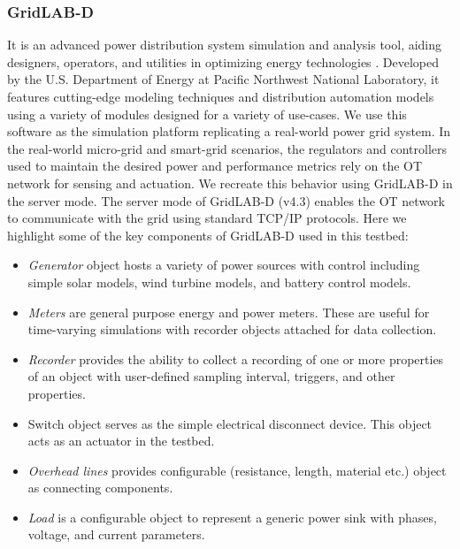 \subsubsection{GridLAB-D} It is an advanced power distribution system simulation and analysis tool, aiding designers, operators, and utilities in optimizing energy technologies \cite{chassin2014gridlab}. Developed by the U.S. Department of Energy at Pacific Northwest National Laboratory, it features cutting-edge modeling techniques and distribution automation models using a variety of modules designed for a variety of use-cases. We use this software as the simulation platform replicating a real-world power grid system. In the real-world micro-grid and smart-grid scenarios, the regulators and controllers used to maintain the desired power and performance metrics rely on the OT network for sensing and actuation. We recreate this behavior using GridLAB-D in the server mode. The server mode of GridLAB-D (v4.3) enables the OT network to communicate with the grid using standard TCP/IP protocols.
Here we highlight some of the key components of GridLAB-D used in this testbed:
\begin{itemize}
    \item \textit{Generator} object hosts a variety of power sources with control including simple solar models, wind turbine models, and battery control models. 
    \item \textit{Meters} are general purpose energy and power meters. These are useful for time-varying simulations with recorder objects attached for data collection.
    \item \textit{Recorder} provides the ability to collect a recording of one or more properties of an object with user-defined sampling interval, triggers, and other properties.
    \item Switch object serves as the simple electrical disconnect device. This object acts as an actuator in the testbed.
    \item \textit{Overhead lines}  provides configurable (resistance, length, material etc.) object as connecting components.
    \item \textit{Load} is a configurable object to represent a generic power sink with phases, voltage, and current parameters.
\end{itemize}

